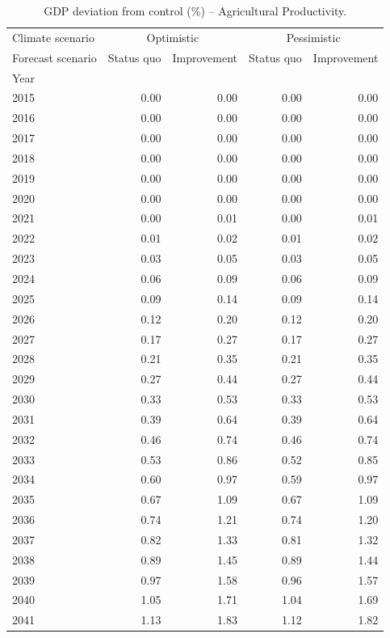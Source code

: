 \begin{table}
\caption{GDP deviation from control (\%) -- Agricultural Productivity.}
\label{tab:results_AGR_control_rel}
\centering
\begin{tabular}{lrrrr}
\toprule
Climate scenario & \multicolumn{2}{c}{Optimistic} & \multicolumn{2}{c}{Pessimistic} \\
Forecast scenario & Status quo & Improvement & Status quo & Improvement \\
Year &  &  &  &  \\
\midrule
2015 & 0.00 & 0.00 & 0.00 & 0.00 \\
2016 & 0.00 & 0.00 & 0.00 & 0.00 \\
2017 & 0.00 & 0.00 & 0.00 & 0.00 \\
2018 & 0.00 & 0.00 & 0.00 & 0.00 \\
2019 & 0.00 & 0.00 & 0.00 & 0.00 \\
2020 & 0.00 & 0.00 & 0.00 & 0.00 \\
2021 & 0.00 & 0.01 & 0.00 & 0.01 \\
2022 & 0.01 & 0.02 & 0.01 & 0.02 \\
2023 & 0.03 & 0.05 & 0.03 & 0.05 \\
2024 & 0.06 & 0.09 & 0.06 & 0.09 \\
2025 & 0.09 & 0.14 & 0.09 & 0.14 \\
2026 & 0.12 & 0.20 & 0.12 & 0.20 \\
2027 & 0.17 & 0.27 & 0.17 & 0.27 \\
2028 & 0.21 & 0.35 & 0.21 & 0.35 \\
2029 & 0.27 & 0.44 & 0.27 & 0.44 \\
2030 & 0.33 & 0.53 & 0.33 & 0.53 \\
2031 & 0.39 & 0.64 & 0.39 & 0.64 \\
2032 & 0.46 & 0.74 & 0.46 & 0.74 \\
2033 & 0.53 & 0.86 & 0.52 & 0.85 \\
2034 & 0.60 & 0.97 & 0.59 & 0.97 \\
2035 & 0.67 & 1.09 & 0.67 & 1.09 \\
2036 & 0.74 & 1.21 & 0.74 & 1.20 \\
2037 & 0.82 & 1.33 & 0.81 & 1.32 \\
2038 & 0.89 & 1.45 & 0.89 & 1.44 \\
2039 & 0.97 & 1.58 & 0.96 & 1.57 \\
2040 & 1.05 & 1.71 & 1.04 & 1.69 \\
2041 & 1.13 & 1.83 & 1.12 & 1.82 \\

\end{tabular}
\end{table}
